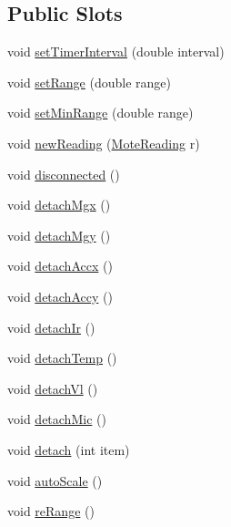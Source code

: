 \subsection*{Public Slots}
\begin{DoxyCompactItemize}
\item 
void \hyperlink{classDataPlot_a926020e0c49d78d3d5d282848368651e}{setTimerInterval} (double interval)
\item 
void \hyperlink{classDataPlot_a642185fdad89b1b075bc00670242fa0b}{setRange} (double range)
\item 
void \hyperlink{classDataPlot_ad101ac80563ee10322788946d791ea09}{setMinRange} (double range)
\item 
void \hyperlink{classDataPlot_a36fe7e25f67a168d4f7dd2eaa2627003}{newReading} (\hyperlink{classMoteReading}{MoteReading} r)
\item 
void \hyperlink{classDataPlot_a78920a414abdfa954fd34c662f39d09e}{disconnected} ()
\item 
void \hyperlink{classDataPlot_a74bc8f9c94caa90e092e1b3235c2c6ec}{detachMgx} ()
\item 
void \hyperlink{classDataPlot_a309a9e4dc84f977bc54f30d0e2cf2350}{detachMgy} ()
\item 
void \hyperlink{classDataPlot_a5dbafea843c682d18d77e1903e3c372b}{detachAccx} ()
\item 
void \hyperlink{classDataPlot_ab9a27391ec25592f1126f672716ab161}{detachAccy} ()
\item 
void \hyperlink{classDataPlot_a63ee85d95a1ce9b0ac889ea16c4827c7}{detachIr} ()
\item 
void \hyperlink{classDataPlot_a21893fd1f06b11e7e3286fa74e8c618f}{detachTemp} ()
\item 
void \hyperlink{classDataPlot_ad350cafabb24a175222744f7c7b3e10e}{detachVl} ()
\item 
void \hyperlink{classDataPlot_a42a2f46b248f64482153739201fc7d2b}{detachMic} ()
\item 
void \hyperlink{classDataPlot_a5521e1760646dbcf90df949e20523803}{detach} (int item)
\item 
void \hyperlink{classDataPlot_a6409fa9685624b4a453529254e6d943f}{autoScale} ()
\item 
void \hyperlink{classDataPlot_abc77f48da64170d587eda09e5aaf008c}{reRange} ()
\end{DoxyCompactItemize}

